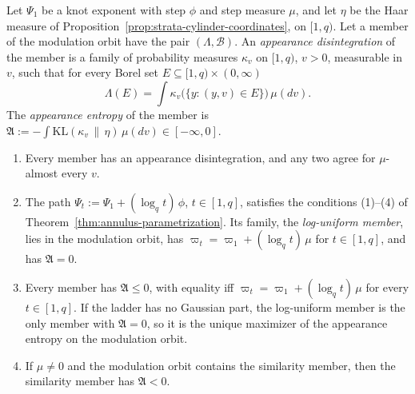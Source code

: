 \begin{proposition}
\label{prop:appearance-entropy}

Let $\Psi_1$ be a knot exponent with step $\phi$ and step measure $\mu$, and let $\eta$ be the Haar
measure of Proposition~\ref{prop:strata-cylinder-coordinates}, on $[1,q)$. Let a member of the
modulation orbit have the pair $(\Lambda, \mathcal{B})$. An \emph{appearance disintegration} of the
member is a family of probability measures $\kappa_v$ on $[1,q)$, $v > 0$, measurable in $v$, such
that for every Borel set $E \subseteq [1,q) \times (0,\infty)$
\[
  \Lambda(E) = \int\kappa_v\bigl(\{y : (y, v) \in E\}\bigr)\,\mu(dv) .
\]
The \emph{appearance entropy} of the member is
$\mathfrak{A} := -\int\mathrm{KL}(\kappa_v \,\|\, \eta)\,\mu(dv) \in [-\infty, 0]$.
\begin{enumerate}
\item Every member has an appearance disintegration, and any two agree for $\mu$-almost every $v$.
\item The path $\Psi_t := \Psi_1 + (\log_qt)\,\phi$, $t \in [1,q]$, satisfies the conditions
(1)--(4) of Theorem~\ref{thm:annulus-parametrization}. Its family, the \emph{log-uniform member},
lies in the modulation orbit, has $\varpi_t = \varpi_1 + (\log_qt)\,\mu$ for $t \in [1,q]$, and has
$\mathfrak{A} = 0$.
\item Every member has $\mathfrak{A} \le 0$, with equality iff
$\varpi_t = \varpi_1 + (\log_qt)\,\mu$ for every $t \in [1,q]$. If the ladder has no Gaussian
part, the log-uniform member is the only member with $\mathfrak{A} = 0$, so it is the unique
maximizer of the appearance entropy on the modulation orbit.
\item If $\mu \ne 0$ and the modulation orbit contains the similarity member, then the similarity
member has $\mathfrak{A} < 0$.
\end{enumerate}
\end{proposition}

